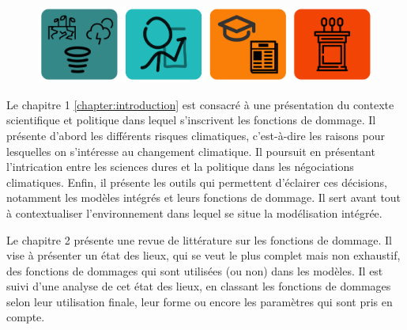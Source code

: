 \begin{figure}
    \centering
    \includegraphics[width=\textwidth]{illustrations/intro.png}
    \label{fig:enter-label}
\end{figure}



Le  chapitre 1 \ref{chapter:introduction} est consacré à une présentation du contexte scientifique et politique dans lequel s'inscrivent les fonctions de dommage. Il présente d'abord les différents risques climatiques, c'est-à-dire les raisons pour lesquelles on s'intéresse au changement climatique. Il poursuit en présentant l'intrication entre les sciences dures et la politique dans les négociations climatiques. Enfin, il présente les outils qui permettent d'éclairer ces décisions, notamment les modèles intégrés et leurs fonctions de dommage. Il sert avant tout à contextualiser l'environnement dans lequel se situe la modélisation intégrée. 

Le chapitre 2 présente une revue de littérature sur les fonctions de dommage. Il vise à présenter un état des lieux, qui se veut le plus complet mais non exhaustif, des fonctions de dommages qui sont utilisées (ou non) dans les modèles. Il est suivi d'une analyse de cet état des lieux, en classant les fonctions de dommages selon leur utilisation finale, leur forme ou encore les paramètres qui sont pris en compte. 

